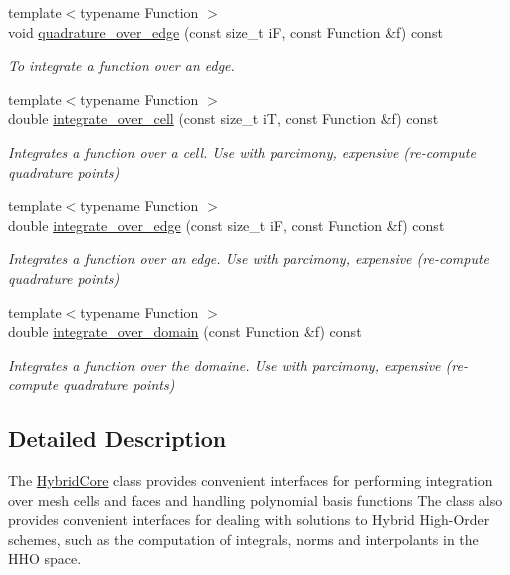 \begin{DoxyCompactItemize}
{\footnotesize template$<$typename Function $>$ }\\void \hyperlink{group__HybridCore_gafbf9c61f2d929331197ba971b52b8710}{quadrature\+\_\+over\+\_\+edge} (const size\+\_\+t iF, const Function \&f) const
\begin{DoxyCompactList}\small\item\em To integrate a function over an edge. \end{DoxyCompactList}\item 
{\footnotesize template$<$typename Function $>$ }\\double \hyperlink{group__HybridCore_ga64ffbc44306e06018efe3cea5a62f652}{integrate\+\_\+over\+\_\+cell} (const size\+\_\+t iT, const Function \&f) const
\begin{DoxyCompactList}\small\item\em Integrates a function over a cell. Use with parcimony, expensive (re-\/compute quadrature points) \end{DoxyCompactList}\item 
{\footnotesize template$<$typename Function $>$ }\\double \hyperlink{group__HybridCore_ga03f276ea9c905d64662c39b7555d560c}{integrate\+\_\+over\+\_\+edge} (const size\+\_\+t iF, const Function \&f) const
\begin{DoxyCompactList}\small\item\em Integrates a function over an edge. Use with parcimony, expensive (re-\/compute quadrature points) \end{DoxyCompactList}\item 
{\footnotesize template$<$typename Function $>$ }\\double \hyperlink{group__HybridCore_gab058c4e54d1e33c49e537b8d0f602848}{integrate\+\_\+over\+\_\+domain} (const Function \&f) const
\begin{DoxyCompactList}\small\item\em Integrates a function over the domaine. Use with parcimony, expensive (re-\/compute quadrature points) \end{DoxyCompactList}\end{DoxyCompactItemize}


\subsection{Detailed Description}
The \hyperlink{classHArDCore2D_1_1HybridCore}{Hybrid\+Core} class provides convenient interfaces for performing integration over mesh cells and faces and handling polynomial basis functions The class also provides convenient interfaces for dealing with solutions to Hybrid High-\/\+Order schemes, such as the computation of integrals, norms and interpolants in the H\+HO space. 

